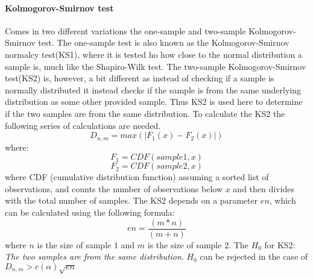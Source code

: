 \paragraph{Kolmogorov-Smirnov test}
Comes in two different variations the one-sample and two-sample Kolmogorov-Smirnov test\cite{massey1951kolmogorov}. The one-sample test is also known as the Kolmogorov-Smirnov normalcy test(KS1), where it is tested ho how close to the normal distribution a sample is, much like the Shapiro-Wilk test. The two-sample Kolmogorov-Smirnov test(KS2) is, however, a bit different as instead of checking if a sample is normally distributed it instead checks if the sample is from the same underlying distribution as some other provided sample. Thus KS2 is used here to determine if the two samples are from the same distribution. To calculate the KS2 the following series of calculations are needed\cite{massey1951kolmogorov}.
$$D_{n,m} = max(|F_1(x)-F_2(x)|)$$
where:
$$F_1 = CDF(sample1,x)$$
$$F_2 = CDF(sample2,x)$$
where CDF (cumulative distribution function) assuming a sorted list of observations, and counts the number of observations below $x$ and then divides with the total number of samples. The KS2 depends on a parameter $en$, which can be calculated using the following formula:
$$en=\frac{(m*n)}{(m+n)}$$
where $n$ is the size of sample $1$ and $m$ is the size of sample $2$.
The $H_0$ for KS2: \textit{The two samples are from the same distribution}.
$H_0$ can be rejected in the case of $D_{n,m} > c(\alpha)\sqrt{en}$\cite{massey1951kolmogorov}
